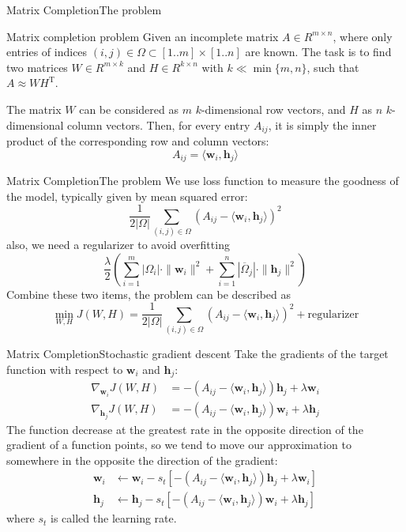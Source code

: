 \documentclass{beamer}
\renewcommand{\vec}{\mathbf}
\begin{document}
  \begin{frame}{Matrix Completion}{The problem}
    \begin{block}{Matrix completion problem}
    Given an incomplete matrix $A \in R^{m \times n}$, where only entries of indices $(i, j) \in \Omega \subset [1 .. m] \times [1 .. n]$ are known. The task is to find two matrices $W \in R^{m \times k}$ and $H \in R^{k \times  n}$ with $k \ll \min\{m,n\}$, such that $A \approx WH^{\text{T}}$.
    \end{block}
    \pause
    The matrix $W$ can be considered as $m$ $k$-dimensional row vectors, and $H$ as $n$ $k$-dimensional column vectors. Then, for every entry $A_{ij}$, it is simply the inner product of the corresponding row and column vectors:
  $$ A_{ij} = \langle \vec{w}_i, \vec{h}_j \rangle$$ 
  \end{frame}
  
  \begin{frame}{Matrix Completion}{The problem}
    We use loss function to measure the goodness of the model, typically given by mean squared error: 
    $$ \frac{1}{2|\Omega|} \sum_{(i, j) \in \Omega} (A_{ij} - \langle \vec{w}_i, \vec{h}_j \rangle)^2 $$
    also, we need a regularizer to avoid overfitting
    $$ \frac{\lambda}{2} ( \sum_{i = 1}^m | \Omega_i | \cdot \|\vec{w}_i\|^2 + \sum_{i=1}^n | \overline{\Omega}_j| \cdot \|\vec{h}_j\|^2) $$
    Combine these two items, the problem can be described as
    $$\min_{W, H} J(W, H) = \frac{1}{2|\Omega|} \sum_{(i, j) \in \Omega} (A_{ij} - \langle \vec{w}_i, \vec{h}_j \rangle)^2 + \text{regularizer}$$
  \end{frame}
  
  \begin{frame}{Matrix Completion}{Stochastic gradient descent}
    Take the gradients of the target function with respect to $\vec{w}_i$ and $\vec{h}_j$:
    \begin{align*}
      \nabla_{\vec{w}_i}J(W, H) &= -(A_{ij} - \langle \vec{w}_i, \vec{h}_j \rangle) \vec{h}_j + \lambda \vec{w}_i \\
      \nabla_{\vec{h}_j}J(W, H) &= -(A_{ij} - \langle \vec{w}_i, \vec{h}_j \rangle) \vec{w}_i + \lambda \vec{h}_j 
    \end{align*}
    \pause
    The function decrease at the greatest rate in the opposite direction of the gradient of a function points, so we tend to move our approximation to somewhere in the opposite the direction of the gradient:
    \begin{align}
      \vec{w}_i &\leftarrow \vec{w}_i - s_t [-(A_{ij} - \langle \vec{w}_i, \vec{h}_j \rangle) \vec{h}_j + \lambda \vec{w}_i] \\
      \vec{h}_j &\leftarrow \vec{h}_j - s_t [-(A_{ij} - \langle \vec{w}_i, \vec{h}_j \rangle) \vec{w}_i + \lambda \vec{h}_j]
    \end{align}
    where $s_t$ is called the learning rate.
  \end{frame}
  
\end{document}
